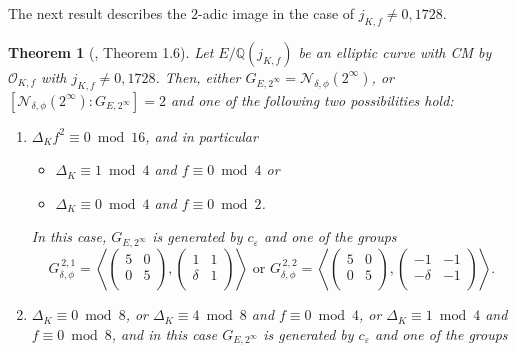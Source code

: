 \documentclass[11pt]{amsart}
\newtheorem{thm}[defn]{Theorem}
\theoremstyle{definition}
\newcommand{\Q}{\mathbb Q}
\newcommand{\OO}{\mathcal{O}}
\begin{document}
The next result describes the $2$-adic image in the case of $j_{K,f}\neq 0,1728$.

\begin{thm}[\cite{lozano-galoiscm}, Theorem 1.6]\label{thm-m8and16alvaro}
	Let $E/\Q(j_{K,f})$ be an elliptic curve with CM by $\OO_{K,f}$ with $j_{K,f}\neq 0, 1728$. Then, either $G_{E,2^{\infty}} = \mathcal{N}_{\delta, \phi}(2^{\infty})$, or $[\mathcal{N}_{\delta, \phi}(2^{\infty}) :  G_{E,2^{\infty}}] = 2$ and one of the following two possibilities hold:
	\begin{enumerate} 
		\item $\Delta_K f^2 \equiv 0 \bmod 16$, and in particular
        \begin{itemize}
         \item $\Delta_K \equiv 1 \bmod 4$ and $f \equiv 0 \bmod 4$ or 
         \item $\Delta_K \equiv 0 \bmod 4$ and $f \equiv 0 \bmod 2$. \end{itemize}
      In this case, $G_{E,2^{\infty}}$ is generated by $c_{\varepsilon}$ and one of the groups
			$$G^{\, 2,1}_{\delta, \phi}=\left\langle \left(\begin{array}{cc} 5 & 0\\ 0 & 5\\\end{array}\right),\left(\begin{array}{cc} 1 & 1\\ \delta & 1\\\end{array}\right)\right\rangle \text{ or } G^{\, 2,2}_{\delta, \phi}=\left\langle \left(\begin{array}{cc} 5 & 0\\ 0 & 5\\\end{array}\right),\left(\begin{array}{cc} -1 & -1\\ -\delta & -1\\\end{array}\right)\right\rangle.$$
		\item $\Delta_K\equiv 0 \bmod 8$, or $\Delta_K\equiv 4 \bmod 8$ and $f\equiv 0 \bmod 4$, or $\Delta_K\equiv 1 \bmod 4$ and $f\equiv 0 \bmod 8$, and in this case $G_{E,2^{\infty}}$ is generated by $c_{\varepsilon}$ and one of the groups

\end{enumerate}
\end{thm}
\end{document}

